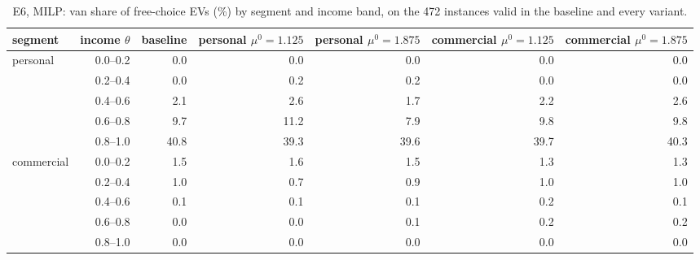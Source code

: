 \begin{table}[H]\centering
\small
\caption{E6, MILP: van share of free-choice EVs (\%) by segment and income band, on the 472 instances valid in the baseline and every variant.}\label{tab:bandE6}
\begin{adjustbox}{max width=\textwidth}\begin{tabular}{lrrrrrr}\toprule
segment & income $\theta$ & baseline & personal $\mu^{0}=1.125$ & personal $\mu^{0}=1.875$ & commercial $\mu^{0}=1.125$ & commercial $\mu^{0}=1.875$ \\ \midrule
personal & 0.0--0.2 & 0.0 & 0.0 & 0.0 & 0.0 & 0.0 \\
 & 0.2--0.4 & 0.0 & 0.2 & 0.2 & 0.0 & 0.0 \\
 & 0.4--0.6 & 2.1 & 2.6 & 1.7 & 2.2 & 2.6 \\
 & 0.6--0.8 & 9.7 & 11.2 & 7.9 & 9.8 & 9.8 \\
 & 0.8--1.0 & 40.8 & 39.3 & 39.6 & 39.7 & 40.3 \\
commercial & 0.0--0.2 & 1.5 & 1.6 & 1.5 & 1.3 & 1.3 \\
 & 0.2--0.4 & 1.0 & 0.7 & 0.9 & 1.0 & 1.0 \\
 & 0.4--0.6 & 0.1 & 0.1 & 0.1 & 0.2 & 0.1 \\
 & 0.6--0.8 & 0.0 & 0.0 & 0.1 & 0.2 & 0.2 \\
 & 0.8--1.0 & 0.0 & 0.0 & 0.0 & 0.0 & 0.0 \\
\bottomrule\end{tabular}\end{adjustbox}\end{table}
